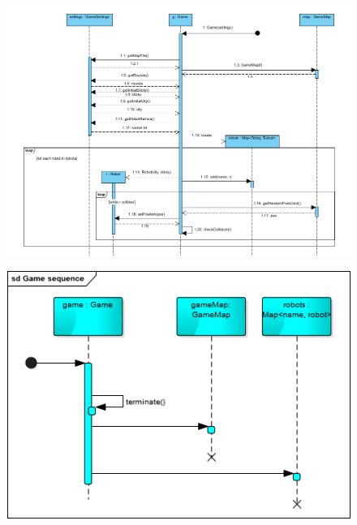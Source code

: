 \begin{figure}[!htbp]
	\begin{center}
		\includegraphics[width=180mm, center]{./chapters/chapter03/startgame.png}
		\caption{}
	\end{center}
\end{figure}

\begin{figure}[!htbp]
	\begin{center}
		\includegraphics[width=180mm, center]{./chapters/chapter03/endgame.png}
		\caption{}
	\end{center}
\end{figure}

